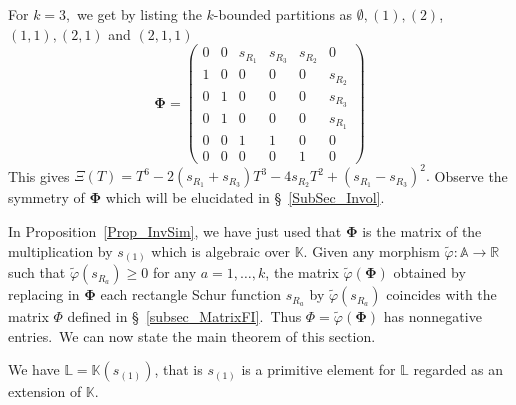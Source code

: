 \documentclass[ALCO,ThmDefs,Unicode,epreuves]{cedram}
\begin{document}

\begin{exam}
\label{ex_k3_Phi}For $k=3,$ we get by listing the $k$-bounded partitions as
$\emptyset,(1),(2)$, $(1,1),(2,1)$ and $(2,1,1)$%
\[
\boldsymbol{\Phi}=\left(
\begin{matrix}
0 & 0 & s_{R_{1}} & s_{R_{3}} & s_{R_{2}} & 0\\
1 & 0 & 0 & 0 & 0 & s_{R_{2}}\\
0 & 1 & 0 & 0 & 0 & s_{R_{3}}\\
0 & 1 & 0 & 0 & 0 & s_{R_{1}}\\
0 & 0 & 1 & 1 & 0 & 0\\
0 & 0 & 0 & 0 & 1 & 0
\end{matrix}
\right)
\]
This gives $\Xi(T)=T^{6}-2\left( s_{R_{1}}+s_{R_{3}}\right) T^{3}-4s_{R_{2}%
}T^{2}+\left( s_{R_{1}}-s_{R_{3}}\right) ^{2}.$ Observe the symmetry of
$\boldsymbol{\Phi}$ which will be elucidated in \S~\ref{SubSec_Invol}.
\end{exam}

In Proposition~\ref{Prop_InvSim}, we have just used that $\boldsymbol{\Phi}$
is the matrix of the multiplication by $s_{(1)}$ which is algebraic over
$\mathbb{K}$. Given any morphism $\widetilde{\varphi}:\mathbb{A}%
\rightarrow\mathbb{R}$ such that $\widetilde{\varphi}(s_{R_{a}})\geq0$ for any
$a=1,\ldots,k$, the matrix $\widetilde{\varphi}(\boldsymbol{\Phi})$ obtained
by replacing in $\boldsymbol{\Phi}$ each rectangle Schur function $s_{R_{a}}$
by $\widetilde{\varphi}(s_{R_{a}})$ coincides with the matrix $\Phi$ defined
in \S~\ref{subsec_MatrixFI}.\ Thus $\Phi=\widetilde{\varphi}%
(\boldsymbol{\Phi})$ has nonnegative entries.\ We can now state the
main theorem of this section.

\begin{theorem}
We have $\mathbb{L}=\mathbb{K}(s_{(1)})$, that is $s_{(1)}$ is a primitive
element for $\mathbb{L}$ regarded as an extension of $\mathbb{K}$.
\end{theorem}
\end{document}
